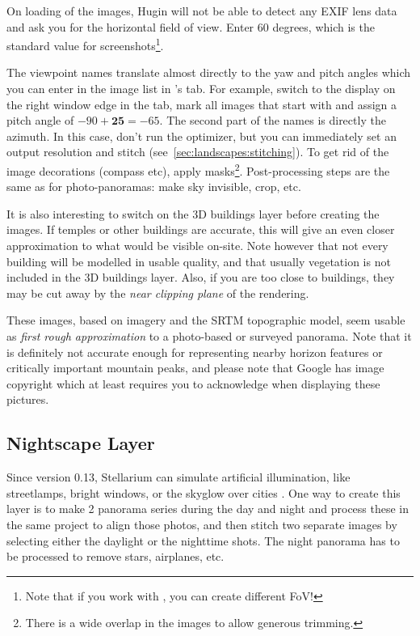 On loading of the images, Hugin will not be able to detect any EXIF
lens data and ask you for the horizontal field of view. Enter 60
degrees, which is the standard value for 
screenshots\footnote{Note that if you work with , you
  can create different FoV!}.

The viewpoint names translate almost directly to the yaw and pitch
angles which you can enter in the image list in 's
 tab. For example, switch to the  display
on the right window edge in the  tab, mark all images that
start with  and assign a pitch angle of
$-90+\mathbf{25}=-65$. The second part of the names is directly the
azimuth.  In this case, don't run the optimizer, but you can
immediately set an output resolution and stitch
(see~\ref{sec:landscapes:stitching}). To get rid of the image
decorations (compass etc), apply masks\footnote{There is a wide
  overlap in the images to allow generous trimming.}. Post-processing
steps are the same as for photo-panoramas: make sky invisible, crop,
etc.

It is also interesting to switch on the 3D buildings layer before
creating the images. If temples or other buildings are accurate, this
will give an even closer approximation to what would be visible
on-site. Note however that not every building will be modelled in
usable quality, and that usually vegetation is not included in the 3D
buildings layer. Also, if you are too close to buildings, they may be
cut away by the \emph{near clipping plane} of the rendering.

These images, based on  imagery and the SRTM
topographic model, seem usable as \emph{first rough approximation} to
a photo-based or surveyed panorama. Note that it is definitely not
accurate enough for representing nearby horizon features or critically
important mountain peaks, and please note that Google has image
copyright which at least requires you to acknowledge when displaying
these pictures.

\subsection{Nightscape Layer}
\label{sec:landscapes:landscapes:Nightscape}

Since version 0.13, Stellarium can simulate artificial illumination,
like streetlamps, bright windows, or the skyglow over cities
\citep{Zotti-Wuchterl:SEAC2014}. One way to
create this layer is to make 2 panorama series during the day and night
and process these in the same  project to align those photos,
and then stitch two separate images by selecting either the daylight or the
nighttime shots. The night panorama has to be processed to remove
stars, airplanes, etc.

